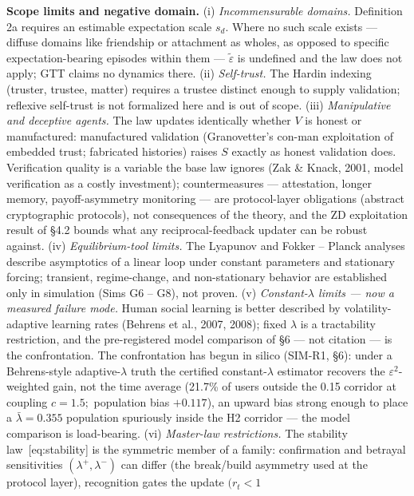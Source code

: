 \documentclass[
]{article}
\begin{document}
\textbf{Scope limits and negative domain.} (i) \emph{Incommensurable
domains.} Definition 2a requires an estimable expectation scale \(s_d.\)
Where no such scale exists --- diffuse domains like friendship or
attachment as wholes, as opposed to specific expectation-bearing
episodes within them --- \(\tilde{\varepsilon}\) is undefined and the
law does not apply; GTT claims no dynamics there. (ii)
\emph{Self-trust.} The Hardin indexing (truster, trustee, matter)
requires a trustee distinct enough to supply validation; reflexive
self-trust is not formalized here and is out of scope. (iii)
\emph{Manipulative and deceptive agents.} The law updates identically
whether \(V\) is honest or manufactured: manufactured validation
(Granovetter's con-man exploitation of embedded trust; fabricated
histories) raises \(S\) exactly as honest validation does. Verification
quality is a variable the base law ignores (Zak \& Knack, 2001, model
verification as a costly investment); countermeasures --- attestation,
longer memory, payoff-asymmetry monitoring --- are protocol-layer
obligations (abstract cryptographic protocols), not consequences of the
theory, and the ZD exploitation result of §4.2 bounds what any
reciprocal-feedback updater can be robust against. (iv)
\emph{Equilibrium-tool limits.} The Lyapunov and Fokker -- Planck
analyses describe asymptotics of a linear loop under constant parameters
and stationary forcing; transient, regime-change, and non-stationary
behavior are established only in simulation (Sims G6 -- G8), not proven.
(v) \emph{Constant-\(\lambda\) limits --- now a measured failure mode.}
Human social learning is better described by volatility-adaptive
learning rates (Behrens et al., 2007, 2008); fixed \(\lambda\) is a
tractability restriction, and the pre-registered model comparison of §6
--- not citation --- is the confrontation. The confrontation has begun
in silico (SIM-R1, §6): under a Behrens-style adaptive-\(\lambda\) truth
the certified constant-\(\lambda\) estimator recovers the
\(\varepsilon^{2}\)-weighted gain, not the time average (21.7\% of users
outside the 0.15 corridor at coupling \(c = 1.5;\) population bias
\(+0.117\)), an upward bias strong enough to place a
\(\bar{\lambda} = 0.355\) population spuriously inside the H2 corridor
--- the model comparison is load-bearing. (vi) \emph{Master-law
restrictions.} The stability law~{[}eq:stability{]} is the symmetric
member of a family: confirmation and betrayal sensitivities
\((\lambda^{+}, \lambda^{-})\) can differ (the break/build asymmetry
used at the protocol layer), recognition gates the update \((r_t < 1\)
\end{document}
